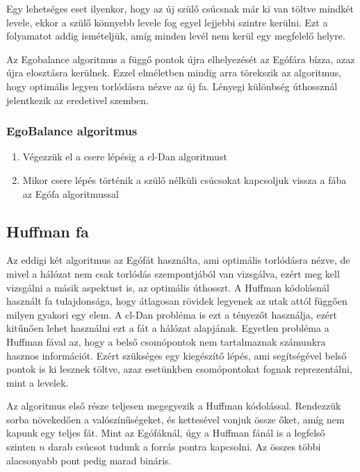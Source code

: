 \documentclass[12pt]{report}
\begin{document}
\pagebreak

Egy lehetséges eset ilyenkor, hogy az új szülő csúcsnak már ki van töltve mindkét levele, ekkor a szülő könnyebb levele fog egyel lejjebbi szintre kerülni.
Ezt a folyamatot addig ismételjük, amíg minden levél nem kerül egy megfelelő helyre.

Az Egobalance algoritmus a függő pontok újra elhelyezését az Egófára bízza, azaz újra elosztásra kerülnek.
Ezzel elméletben mindig arra törekszik az algoritmus, hogy optimális legyen torlódásra nézve az új fa.
Lényegi különbség úthossznál jelentkezik az eredetivel szemben.

\subsubsection{EgoBalance algoritmus}
\begin{enumerate}
	\item Végezzük el a csere lépésig a cl-Dan algoritmust
	\item Mikor csere lépés történik a szülő nélküli csúcsokat kapcsoljuk vissza a fába az Egófa algoritmussal
\end{enumerate}

\subsection{Huffman fa}

Az eddigi két algoritmus az Egófát \cite{avin_demand-aware_nodate} használta, ami optimális torlódásra nézve, de mivel a hálózat nem csak torlódás szempontjából van vizsgálva, ezért meg kell vizsgálni a másik aspektust is, az optimális úthosszt.
A Huffman kódolásnál \cite{huf52} használt fa tulajdonsága, hogy átlagosan rövidek legyenek az utak attól függően milyen gyakori egy elem.
A cl-Dan probléma is ezt a tényezőt használja, ezért kitűnően lehet használni ezt a fát a hálózat alapjának.
Egyetlen probléma a Huffman fával az, hogy a belső csomópontok nem tartalmaznak számunkra hasznos információt.
Ezért szükséges egy kiegészítő lépés, ami segítségével belső pontok is ki lesznek töltve, azaz esetünkben csomópontokat fognak reprezentálni, mint a levelek.

Az algoritmus első része teljesen megegyezik a Huffman kódolással.
Rendezzük sorba növekedően a valószínűségeket, és kettesével vonjuk össze őket, amíg nem kapunk egy teljes fát.
Mint az Egófáknál, úgy a Huffman fánál is a legfelső szinten \(n\) darab csúcsot tudunk a forrás pontra kapcsolni.
Az összes többi alacsonyabb pont pedig marad bináris.
\end{document}
